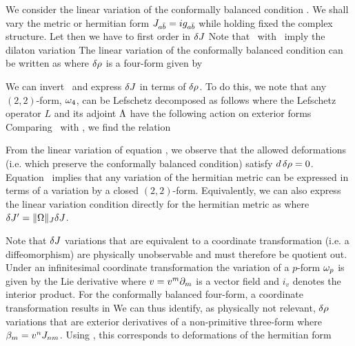 We consider the linear variation of the conformally balanced
condition \balance. We shall vary the metric or hermitian form
$J_{a{\bar b}}=ig_{a{\bar b}}$ while holding fixed the complex structure.  Let
\eqn{} then we
have to first order in $\delta J$ \eqn{} \eqn{}
Note that \Omdef\ with \Omvar\ imply the dilaton variation
\eqn{} The linear variation of the
conformally balanced condition can be written as
\eqn{} where
$\delta \rho$ is a four-form given by \eqn{}

We can invert \confbalvv\ and express $\delta J$ in terms of $\delta\rho$.
To do this, we note that any $(2,2)$-form, $\omega_4$, can be
Lefschetz decomposed as follows \eqn{} where the Lefschetz operator $L$
and its adjoint $\Lambda$ have the following action on exterior forms
\eqn{} Comparing \confbalvv\ with \Ldecomp, we find the
relation \eqn{}

From the linear variation of equation \confbalv, we observe that
the allowed deformations (i.e. which preserve the conformally
balanced condition) satisfy $d\, \delta \rho =0$. Equation \Jrho\
implies that any variation of the hermitian metric can be
expressed in terms of a variation by a closed $(2,2)$-form.
Equivalently, we can also express the linear variation condition
directly for the hermitian metric as \eqn{} where $\delta J' =
\|\Omega\|_J \delta J$.


Note that $\delta J$ variations that are equivalent to a coordinate
transformation (i.e. a diffeomorphism) are physically unobservable
and must therefore be quotient out. Under an infinitesimal
coordinate transformation \eqn{}
the variation of a $p$-form $\omega_p$ is given by the Lie derivative
\eqn\omvar{\d \om_p = - \CL_v\,\om_p = - [i_v(d\,\om_p) + d(i_v\,
\om_p)]~, } where $v=v^m\partial_m$ is a vector field and $i_v$ denotes
the interior product.  For the conformally balanced four-form, a
coordinate transformation results in \eqn{} We can thus identify, as physically not relevant,
$\delta \rho$ variations that are exterior derivatives of a
non-primitive three-form \eqn\rhodiffeo{ \d \rho \sim d (\|\O\|_J
\b \w J),} where $\beta_m = v^n J_{nm}$. Using \Jrho, this
corresponds to deformations of the hermitian form \eqn\Jdiffeo{\d
J \sim \frac{1}{\|\O\|_J} \La\, d (\|\O\|_J \b \w J)~.}

